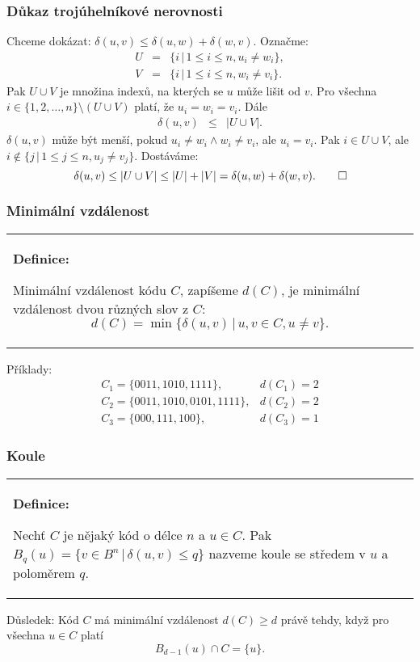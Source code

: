 \documentclass{beamer}
\newenvironment{definice}
{
    \begin{center}
    \begin{tabular}{p{9cm}}
    \textbf{Definice:}
}
{
    \end{tabular}
    \end{center}
}
\newcommand{\sep}{\,|\,}
\begin{document}
\begin{frame}[t,fragile]\frametitle{Důkaz trojúhelníkové nerovnosti} 
Chceme dokázat: $\delta(u,v)\le\delta(u,w)+\delta(w,v)$. Označme:
\begin{eqnarray*}
U&=&\{i\sep 1\le i \le n, u_i\ne w_i\},\\
V&=&\{i\sep 1\le i \le n, w_i\ne v_i\}.
\end{eqnarray*}
Pak $U\cup V$ je množina indexů, na kterých se $u$ může lišit od $v$. Pro všechna $i\in \{1,2,\dots,n\}\setminus(U\cup V)$ platí, že $u_i=w_i=v_i$. Dále
\begin{eqnarray*}
\delta(u,v)&\le&|U\cup V|.
\end{eqnarray*}
$\delta(u,v)$ může být menší, pokud $u_i\ne w_i \wedge w_i\ne v_i$, ale $u_i=v_i$. Pak $i\in U\cup V$, ale $i\notin \{j\sep 1\le j \le n, u_j\ne v_j\}$. Dostáváme:
\begin{equation*}
    \delta(u,v)\le|U\cup V|\le|U|+|V|=\delta(u,w)+\delta(w,v).\qed
\end{equation*}
\end{frame}


\begin{frame}[t,fragile]\frametitle{Minimální vzdálenost} 
\begin{definice}
Minimální vzdálenost kódu $C$, zapíšeme $d(C)$, je minimální vzdálenost dvou různých slov z $C$:
$$
d(C) = \min\{\delta(u,v)\sep u,v\in C, u\ne v\}.
$$
\end{definice}

Příklady:
\begin{eqnarray*}
C_1=\{0011, 1010, 1111\},& d(C_1)=2\\ 
C_2=\{0011, 1010, 0101, 1111\},& d(C_2)=2\\ 
C_3=\{000, 111, 100\},& d(C_3)=1
\end{eqnarray*}
\end{frame}


\begin{frame}[t,fragile]\frametitle{Koule} 
\begin{definice}
Nechť $C$ je nějaký kód o délce $n$ a $u\in C$. Pak $B_q(u)=\{v\in B^n\sep \delta(u,v)\le q\}$ nazveme koule se středem v $u$ a poloměrem $q$.
\end{definice}

Důsledek: Kód $C$ má minimální vzdálenost $d(C)\ge d$ právě tehdy, když pro všechna $u\in C$ platí
$$
B_{d-1}(u) \cap C = \{u\}.
$$
\end{frame}
\end{document}

